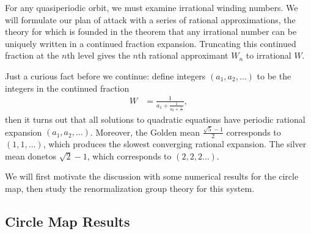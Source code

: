 \documentclass[12pt]{article}
\begin{document}
For any quasiperiodic orbit, we must examine irrational winding numbers. We will
formulate our plan of attack with a series of rational approximations, the
theory for which is founded in the theorem that any irrational number can be
uniquely written in a continued fraction expansion. Truncating this continued
fraction at the $n$th level gives the $n$th rational approximant $W_n$ to
irrational $W$.

Just a curious fact before we continue: define integers $(a_1, a_2,\dots)$ to be
the integers in the continued fraction
\begin{align}
    W &= \frac{1}{a_1 + \frac{1}{a_2 + \frac{1}{\dots}}},
\end{align}
then it turns out that all solutions to quadratic equations have periodic
rational expansion $(a_1, a_2,\dots)$. Moreover, the Golden mean
$\frac{\sqrt{5} - 1}{2}$ corresponds to $(1,1,\dots)$, which produces the
slowest converging rational expansion. The silver mean donetos $\sqrt{2} - 1$,
which corresponds to $(2,2,2\dots)$.

We will first motivate the discussion with some numerical results for the circle
map, then study the renormalization group theory for this system.

\subsection{Circle Map Results}
\end{document}
